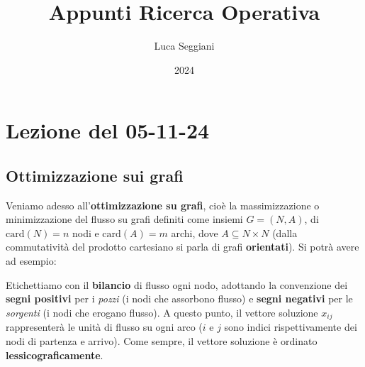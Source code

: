 \documentclass[a4paper,11pt]{article}
\title{Appunti Ricerca Operativa}
\author{Luca Seggiani}
\date{2024}
\begin{document}
\section{Lezione del 05-11-24}

\thispagestyle{empty}
\pagestyle{fancy}

\subsection{Ottimizzazione sui grafi}
Veniamo adesso all'\textbf{ottimizzazione su grafi}, cioè la massimizzazione o minimizzazione del flusso su grafi definiti come insiemi $G = (N,A)$, di $\mathrm{card}(N) = n$ nodi e $\mathrm{card}(A) = m$ archi, dove $A \subseteq N \times N$ (dalla commutatività del prodotto cartesiano si parla di grafi \textbf{orientati}).
Si potrà avere ad esempio:

\begin{center}
\end{center}

Etichettiamo con il \textbf{bilancio} di flusso ogni nodo, adottando la convenzione dei \textbf{segni positivi} per i \textit{pozzi} (i nodi che assorbono flusso) e \textbf{segni negativi} per le \textit{sorgenti} (i nodi che erogano flusso).
A questo punto, il vettore soluzione $x_{ij}$ rappresenterà le unità di flusso su ogni arco ($i$ e $j$ sono indici rispettivamente dei nodi di partenza e arrivo).
Come sempre, il vettore soluzione è ordinato \textbf{lessicograficamente}.
\end{document}
